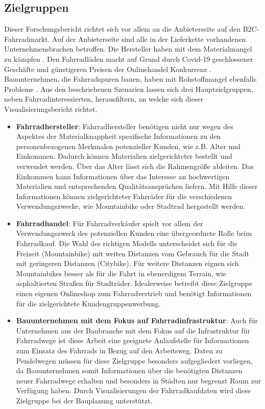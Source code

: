 \documentclass[usegeometry=true]{scrartcl}
\begin{document}
\subsection{Zielgruppen}
Dieser Forschungsbericht richtet sich vor allem an die Anbieterseite auf den B2C-Fahrradmarkt. Auf der Anbieterseite sind alle in der Lieferkette vorhandenen Unternehmensbrachen betroffen. Die Hersteller haben mit dem Materialmangel zu kämpfen \cite{tagesschau.11.03.2021}. Den Fahrradläden macht auf Grund durch Covid-19 geschlossener Geschäfte und günstigeren Preisen der Onlinehandel Konkurrenz \cite{VeloTOTALDasgroteNetzwerkrundumdasThemaFahrrad.2021,Follmer.03.09.2021}. Bauunternehmen, die Fahrradspuren bauen, haben mit Rohstoffmangel ebenfalls Probleme \cite{Knitterscheidt.14.06.2021}. Aus den beschriebenen Szenarien lassen sich drei Hauptzielgruppen, neben Fahrradinteressierten, herausfiltern, an welche sich dieser Visualisierungsbericht richtet.
\begin{itemize}
 \item \textbf{Fahrradhersteller}: 
 \newline Fahrradhersteller benötigen nicht nur wegen des Aspektes der Materialknappheit spezifische Informationen zu den personenbezogenen Merkmalen potenzieller Kunden, wie z.B.  Alter und Einkommen. Dadurch können Materialien zielgerichteter bestellt und verwendet werden. Über das Alter lässt sich die Rahmengröße ableiten. Das Einkommen kann Informationen über das Interesse an hochwertigen Materialien und entsprechenden Qualitätsansprüchen liefern. Mit Hilfe dieser Informationen können zielgerichteter Fahrräder für die verschiedenen Verwendungszwecke, wie Mountainbike oder Stadtrad hergestellt werden. 
 \item \textbf{Fahrradhandel}:
 \newline Für Fahrradverkäufer spielt vor allem der Verwendungszweck des potenziellen Kunden eine übergeordnete Rolle beim Fahrradkauf. Die Wahl des richtigen Modells unterscheidet sich für die Freizeit (Mountainbike) mit weiten Distanzen vom Gebrauch für die Stadt mit geringeren Distanzen (Citybike). Für weitere Distanzen eignen sich Mountainbikes besser als für die Fahrt in ebenerdigem Terrain, wie asphaltierten Straßen für Stadträder. Idealerweise betreibt diese Zielgruppe einen eigenen Onlineshop zum Fahrradvertrieb und benötigt Informationen für die zielgerichtete Kundengruppenwerbung. 

 \item \textbf{Bauunternehmen mit dem Fokus auf Fahrradinfrastruktur}:
 \newline Auch für Unternehmen aus der Baubranche mit dem Fokus auf die Infrastruktur für Fahrradwege ist diese Arbeit eine geeignete Anlaufstelle für Informationen zum Einsatz des Fahrrads in Bezug auf den Arbeitsweg. Daten zu Pendelwegen müssen für diese Zielgruppe besonders aufgegliedert vorliegen, da Bauunternehmen somit Informationen über die benötigten Distanzen neuer Fahrradwege erhalten und besonders in Städten nur begrenzt Raum zur Verfügung haben. Durch Visualisierungen der Fahrradkaufdaten wird diese Zielgruppe bei der Bauplanung unterstützt.
 
\end{itemize}
\end{document}
